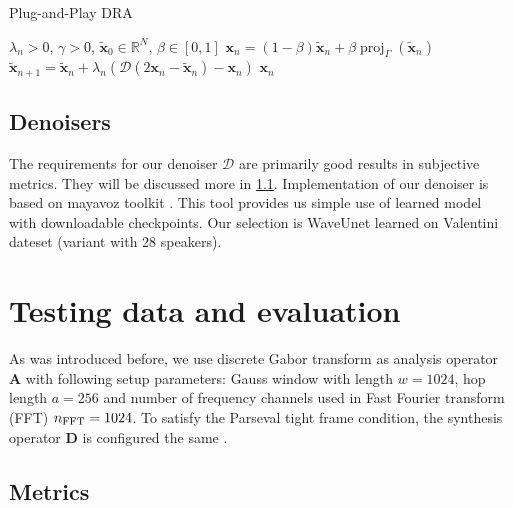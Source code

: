\documentclass[conference]{IEEEtran}
\begin{document}
\begin{algorithm}
	\caption{Plug-and-Play DRA}
	\begin{algorithmic}[1]\label{alg:pnp}
		\renewcommand{\algorithmicrequire}{\textbf{Input:}}
		\renewcommand{\algorithmicensure}{\textbf{Output:}}
		\REQUIRE $ \lambda_n > 0 $, $ \gamma>0 $, $ \mathbf{\widetilde{x}}_0 \in \mathbb{R}^{N} $, $\beta \in [0, 1]$
		\STATE %
		$\mathbf{x}_n= (1-\beta)\mathbf{\widetilde{x}}_n + \beta \operatorname{proj}_{\Gamma}(\mathbf{\widetilde{x}}_n) $ 
		\STATE $ \mathbf{\widetilde{x}}_{n+1} = \mathbf{\widetilde{x}}_n + \lambda_n \left( \mathcal{D} \left(2\mathbf{x}_n-\mathbf{\widetilde{x}}_n \right)-\mathbf{x}_n\right)$
		\ENDFOR
		\RETURN $\mathbf{x}_n$ 
	\end{algorithmic} 
\end{algorithm}

\subsection{Denoisers}

The requirements for our denoiser $\mathcal{D}$ are primarily good results in subjective metrics.
They will be discussed more in \ref{subsec:metrics}.
Implementation of our denoiser is based on mayavoz toolkit \cite{Shahul2023}.
This tool provides us simple use of learned model with downloadable checkpoints.
Our selection is WaveUnet learned on Valentini dateset \cite{ValentiniBotinhao2017}(variant with 28 speakers).

\section{Testing data and evaluation}\label{sec:eval}

As was introduced before, we use discrete Gabor transform as analysis operator $\mathbf{A}$ with following setup parameters: Gauss  window with length $w =1024 $, hop length $a = 256$ and number of frequency channels used in Fast Fourier transform (FFT) $n_{\textup{FFT}} = 1024$.
To satisfy the Parseval tight frame condition, the synthesis operator $\mathbf{D}$ is configured the same \cite{Mokry2020}.

\subsection{Metrics}\label{subsec:metrics}
\end{document}
